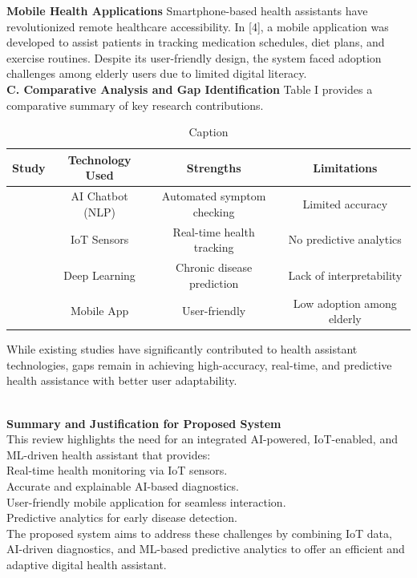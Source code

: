 \textbf{Mobile Health Applications}
Smartphone-based health assistants have revolutionized remote healthcare accessibility. In [4], a mobile application was developed to assist patients in tracking medication schedules, diet plans, and exercise routines. Despite its user-friendly design, the system faced adoption challenges among elderly users due to limited digital literacy.\\
\textbf{C. Comparative Analysis and Gap Identification}
Table I provides a comparative summary of key research contributions.
\begin{table}
    \centering
    \caption{Caption}
    \begin{tabular}{|c|c|c|c|} \hline 
        Study			 & Technology Used & Strengths  & Limitations\\ \hline
       [1]	  & AI Chatbot (NLP)		  &Automated symptom checking  &Limited accuracy  \\\hline
      [2]	  &IoT Sensors	   & Real-time health tracking	 & No predictive analytics \\\hline
       [3]	  & Deep Learning	 & Chronic disease prediction	 & Lack of interpretability \\ \hline
       [4] &	Mobile App	&User-friendly&	Low adoption among elderly \\ \hline
    \end{tabular}
    
    \label{tab:my_label}
\end{table}
While existing studies have significantly contributed to health assistant technologies, gaps remain in achieving high-accuracy, real-time, and predictive health assistance with better user adaptability.


\\\textbf{Summary and Justification for Proposed System}
\\This review highlights the need for an integrated AI-powered, IoT-enabled, and ML-driven health assistant that provides:
\\
Real-time health monitoring via IoT sensors.
\\Accurate and explainable AI-based diagnostics.
\\User-friendly mobile application for seamless interaction.
\\Predictive analytics for early disease detection.
\\The proposed system aims to address these challenges by combining IoT data, AI-driven diagnostics, and ML-based predictive analytics to offer an efficient and adaptive digital health assistant.

